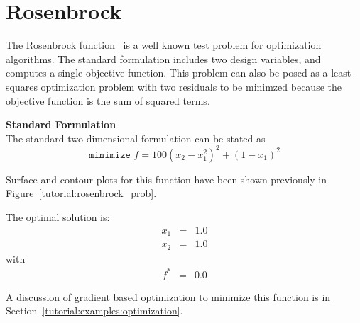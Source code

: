 \clearpage
\section{Rosenbrock}\label{additional:rosenbrock}

The Rosenbrock function~\cite{Gil81} is a well known test problem
for optimization algorithms. The standard formulation includes two design variables,
and computes a single objective function.
This problem can also be posed as a least-squares optimization 
problem with two residuals to be minimzed because the objective 
function is the sum of squared terms.


{\bf Standard Formulation} \\
The standard two-dimensional formulation can be stated as
\begin{equation}
\texttt{minimize } f=100(x_2-x_1^2)^2+(1-x_1)^2 \label{additional:rosenstd}
\end{equation}

Surface and contour plots for this function have been shown previously
in Figure~\ref{tutorial:rosenbrock_prob}. 

The optimal solution is:
\begin{eqnarray*}
    x_1 &=& 1.0 \\
    x_2 &=& 1.0
\end{eqnarray*}
with
\begin{eqnarray*}
    f^{\ast} &=& 0.0
\end{eqnarray*}

A discussion of gradient based optimization to minimize 
this function is in Section~\ref{tutorial:examples:optimization}.

% 
% 

